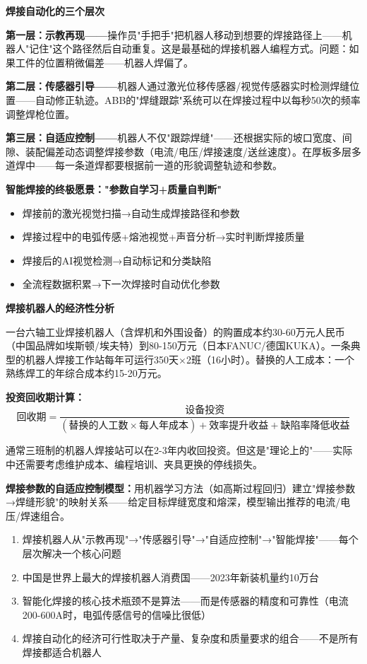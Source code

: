 \documentclass[a4paper,11pt]{ctexbook}
\newenvironment{qualitative}{\vspace{0.3cm}\noindent\begin{tcolorbox}[colback=themeblue!5!white,colframe=themeblue!60!black,title=\textcolor{themeblue}{\textbf{定性分析}}]\vspace{0.1cm}}{\end{tcolorbox}\vspace{0.3cm}}
\newenvironment{quantitative}{\vspace{0.3cm}\noindent\begin{tcolorbox}[colback=quant!5!white,colframe=quant!60!black,title=\textcolor{quant}{\textbf{定量分析}}]\vspace{0.1cm}}{\end{tcolorbox}\vspace{0.3cm}}
\newenvironment{lessonsummary}{\vspace{0.3cm}\noindent\begin{tcolorbox}[colback=summarybg,colframe=green!50!black,title=\textbf{总结}]\vspace{0.1cm}}{\end{tcolorbox}\vspace{0.3cm}}
\begin{document}
\begin{qualitative}
\textbf{焊接自动化的三个层次}

\textbf{第一层：示教再现——}操作员"手把手"把机器人移动到想要的焊接路径上——机器人"记住"这个路径然后自动重复。这是最基础的焊接机器人编程方式。问题：如果工件的位置稍微偏差——机器人焊偏了。

\textbf{第二层：传感器引导——}机器人通过激光位移传感器/视觉传感器实时检测焊缝位置——自动修正轨迹。ABB的"焊缝跟踪"系统可以在焊接过程中以每秒50次的频率调整焊枪位置。

\textbf{第三层：自适应控制——}机器人不仅"跟踪焊缝"——还根据实际的坡口宽度、间隙、装配偏差动态调整焊接参数（电流/电压/焊接速度/送丝速度）。在厚板多层多道焊中——每一条道焊都要根据前一道的形貌调整轨迹和参数。

\textbf{智能焊接的终极愿景："参数自学习+质量自判断"}
\begin{itemize}
  \item 焊接前的激光视觉扫描→自动生成焊接路径和参数
  \item 焊接过程中的电弧传感+熔池视觉+声音分析→实时判断焊接质量
  \item 焊接后的AI视觉检测→自动标记和分类缺陷
  \item 全流程数据积累→下一次焊接时自动优化参数
\end{itemize}
\end{qualitative}

\begin{quantitative}
\textbf{焊接机器人的经济性分析}

一台六轴工业焊接机器人（含焊机和外围设备）的购置成本约30-60万元人民币（中国品牌如埃斯顿/埃夫特）到80-150万元（日本FANUC/德国KUKA）。一条典型的机器人焊接工作站每年可运行350天×2班（16小时）。替换的人工成本：一个熟练焊工的年综合成本约15-20万元。

\textbf{投资回收期计算：}
\[
\text{回收期} = \frac{\text{设备投资}}{(\text{替换的人工数} \times \text{每人年成本}) + \text{效率提升收益} + \text{缺陷率降低收益}}
\]

通常三班制的机器人焊接站可以在2-3年内收回投资。但这是"理论上的"——实际中还需要考虑维护成本、编程培训、夹具更换的停线损失。

\textbf{焊接参数的自适应控制模型：}用机器学习方法（如高斯过程回归）建立"焊接参数→焊缝形貌"的映射关系——给定目标焊缝宽度和熔深，模型输出推荐的电流/电压/焊速组合。
\end{quantitative}

\begin{lessonsummary}
\begin{enumerate}
  \item 焊接机器人从"示教再现"→"传感器引导"→"自适应控制"→"智能焊接"——每个层次解决一个核心问题
  \item 中国是世界上最大的焊接机器人消费国——2023年新装机量约10万台
  \item 智能化焊接的核心技术瓶颈不是算法——而是传感器的精度和可靠性（电流200-600A时，电弧传感信号的信噪比很低）
  \item 焊接自动化的经济可行性取决于产量、复杂度和质量要求的组合——不是所有焊接都适合机器人
\end{enumerate}
\end{lessonsummary}
\end{document}
